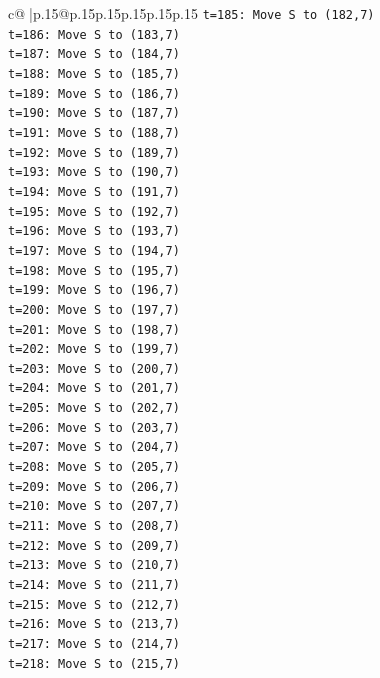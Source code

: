 \documentclass{article}
\begin{document}
{\begin{supertabular}{c@{$\;$}|p{.15\linewidth}@{}p{.15\linewidth}p{.15\linewidth}p{.15\linewidth}p{.15\linewidth}p{.15\linewidth}}
{{{\texttt{t=185: Move S to (182,7)} \\
\texttt{t=186: Move S to (183,7)} \\
\texttt{t=187: Move S to (184,7)} \\
\texttt{t=188: Move S to (185,7)} \\
\texttt{t=189: Move S to (186,7)} \\
\texttt{t=190: Move S to (187,7)} \\
\texttt{t=191: Move S to (188,7)} \\
\texttt{t=192: Move S to (189,7)} \\
\texttt{t=193: Move S to (190,7)} \\
\texttt{t=194: Move S to (191,7)} \\
\texttt{t=195: Move S to (192,7)} \\
\texttt{t=196: Move S to (193,7)} \\
\texttt{t=197: Move S to (194,7)} \\
\texttt{t=198: Move S to (195,7)} \\
\texttt{t=199: Move S to (196,7)} \\
\texttt{t=200: Move S to (197,7)} \\
\texttt{t=201: Move S to (198,7)} \\
\texttt{t=202: Move S to (199,7)} \\
\texttt{t=203: Move S to (200,7)} \\
\texttt{t=204: Move S to (201,7)} \\
\texttt{t=205: Move S to (202,7)} \\
\texttt{t=206: Move S to (203,7)} \\
\texttt{t=207: Move S to (204,7)} \\
\texttt{t=208: Move S to (205,7)} \\
\texttt{t=209: Move S to (206,7)} \\
\texttt{t=210: Move S to (207,7)} \\
\texttt{t=211: Move S to (208,7)} \\
\texttt{t=212: Move S to (209,7)} \\
\texttt{t=213: Move S to (210,7)} \\
\texttt{t=214: Move S to (211,7)} \\
\texttt{t=215: Move S to (212,7)} \\
\texttt{t=216: Move S to (213,7)} \\
\texttt{t=217: Move S to (214,7)} \\
\texttt{t=218: Move S to (215,7)} \\
}}}
\end{supertabular}}
\end{document}

